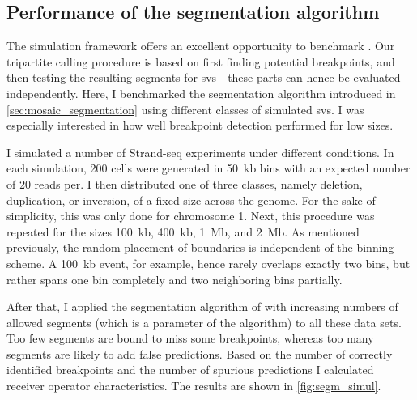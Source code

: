 \subsection{Performance of the segmentation algorithm}
\label{sec:mosaic_segm_simul}

The simulation framework offers an excellent opportunity to benchmark \mc. Our
tripartite calling procedure is based on first finding potential breakpoints,
and then testing the resulting segments for \acp{sv}---these parts can hence be
evaluated independently. Here, I benchmarked the segmentation algorithm
introduced in \cref{sec:mosaic_segmentation} using different classes of
simulated \acp{sv}. I was especially interested in how well breakpoint detection
performed for low \sv sizes.

I simulated a number of Strand-seq experiments under different conditions. In
each simulation, 200 cells were generated in 50~kb bins with an expected number
of 20 reads per. I then distributed one of three \sv classes, namely
deletion, duplication, or inversion, of a fixed size across the genome. For the
sake of simplicity, this was only done for chromosome 1. Next, this procedure
was repeated for the \sv sizes 100~kb, 400~kb, 1~Mb, and 2~Mb. As mentioned
previously, the random placement of \sv boundaries is independent of the binning
scheme. A 100~kb event, for example, hence rarely overlaps exactly two bins, but
rather spans one bin completely and two neighboring bins partially.

After that, I applied the segmentation algorithm of \mc with
increasing numbers of allowed segments (which is a parameter
of the algorithm) to all these data sets. Too few segments
are bound to miss some \sv breakpoints, whereas too many segments are likely to add false
predictions. Based on the number of correctly identified breakpoints and the
number of spurious predictions I calculated receiver operator characteristics.
The results are shown in \cref{fig:segm_simul}.


